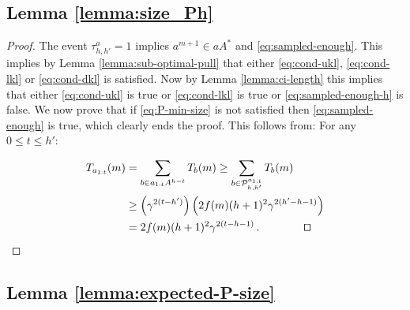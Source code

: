 \documentclass[runningheads]{llncs}
\begin{document}
\subsection{Lemma \ref{lemma:size_Ph}}
\begin{proof}
The event $\tau^a_{h,h'}=1$ implies $a^{m+1}\in a A^*$ and \eqref{eq:sampled-enough}. This implies by Lemma \ref{lemma:sub-optimal-pull} that either \eqref{eq:cond-ukl}, \eqref{eq:cond-lkl} or \eqref{eq:cond-dkl} is satisfied. Now by Lemma \ref{lemma:ci-length} this implies that either \eqref{eq:cond-ukl} is true or \eqref{eq:cond-lkl} is true or \eqref{eq:sampled-enough-h} is false. We now prove that if \eqref{eq:P-min-size} is not satisfied then \eqref{eq:sampled-enough} is true, which clearly ends the proof.
This follows from: For any $0 \leq t \leq h'$:

\begin{align*}
    T_{a_{1:t}}(m) &= \sum_{b\in a_{1:t}A^{h-t}} T_b(m) \geq \sum_{b\in \mathcal{P}^{a_{1:t}}_{h,h'}} T_b(m) \\
    &\geq \left(\gamma^{2(t-h')}\right) \left(2f(m)(h+1)^2\gamma^{2(h'-h-1)}\right)\\
    &= 2f(m)(h+1)^2\gamma^{2(t-h-1)}\,.\qquad\qquad\qed
\end{align*}
\end{proof}

\subsection{Lemma \ref{lemma:expected-P-size}}
\end{document}
